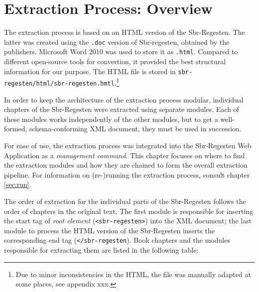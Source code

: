 \section{Extraction Process: Overview}
\label{sec:overview}

The extraction process is based on an HTML version of the Sbr-Regesten. The latter was created using the \texttt{.doc} version of Sbr-regesten, obtained by the publishers. Microsoft Word 2010 was used to store it as \texttt{.html}. Compared to different open-source tools for convertion, it provided the best structural information for our purpose. The HTML file is stored in \texttt{sbr-regesten/html/sbr-regesten.hmtl}.\footnote{Due to minor inconsistencies in the HTML, the file was manually adapted at some places, see appendix xxx.}

In order to keep the architecture of the extraction process modular,
individual chapters of the Sbr-Regesten were extracted using separate
modules. Each of these modules works independently of the other
modules, but to get a well-formed, schema-conforming XML document,
they must be used in succession.

For ease of use, the extraction process was integrated into the
Sbr-Regesten Web Application as a \emph{management command}. This
chapter focuses on where to find the extraction modules and how they
are chained to form the overall extraction pipeline. For information
on (re-)running the extraction process, consult chapter \ref{sec:run}.

The order of extraction for the individual parts of the Sbr-Regesten
follows the order of chapters in the original text. The first module
is responsible for inserting the start tag of \emph{root element}
(\texttt{<sbr-regesten>}) into the XML document; the last module to
process the HTML version of the Sbr-Regesten inserts the corresponding
end tag (\texttt{</sbr-regesten}). Book chapters and the modules
responsible for extracting them are listed in the following table:


